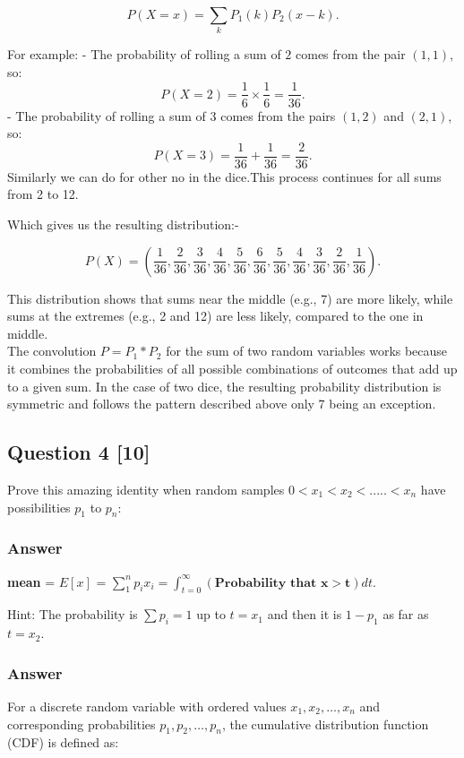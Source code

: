 \documentclass[12pt]{article}
\begin{document}
\[
P(X = x) = \sum_{k} P_1(k) P_2(x - k).
\]

For example:
- The probability of rolling a sum of \( 2 \) comes from the pair \( (1, 1) \), so:
  \[
  P(X = 2) = \frac{1}{6} \times \frac{1}{6} = \frac{1}{36}.
  \]
- The probability of rolling a sum of \( 3 \) comes from the pairs \( (1, 2) \) and \( (2, 1) \), so:
  \[
  P(X = 3) = \frac{1}{36} + \frac{1}{36} = \frac{2}{36}.
  \]
Similarly we can do for other no in the dice.This process continues for all sums from 2 to 12.



Which gives us the resulting distribution:-



\[
P(X) = \left( \frac{1}{36}, \frac{2}{36}, \frac{3}{36}, \frac{4}{36}, \frac{5}{36}, \frac{6}{36}, \frac{5}{36}, \frac{4}{36}, \frac{3}{36}, \frac{2}{36}, \frac{1}{36} \right).
\]

This distribution shows that sums near the middle (e.g., 7) are more likely, while sums at the extremes (e.g., 2 and 12) are less likely, compared to the one in middle.\\
The convolution \( P = P_1 * P_2 \) for the sum of two random variables works because it combines the probabilities of all possible combinations of outcomes that add up to a given sum. In the case of two dice, the resulting probability distribution is symmetric and follows the pattern described above only 7 being an exception.



\subsection*{Question 4 [10]}
Prove this amazing identity when random samples \( 0<x_1 < x_2<.....<x_n \) have possibilities \( p_1 \) to \( p_n \):\\
\subsubsection*{Answer}

\begin{center}
\textbf{mean} = \( E[x] \) = \( \sum_{1}^{n} p_i x_i = \int_{t=0}^{\infty} (\textbf{Probability that x} > \textbf{t})dt \).
\end{center}
Hint: The probability is \( \sum p_i = 1 \) up to \( t = x_1 \) and then it is \( 1 - p_1 \) as far as \( t = x_2 \).
\subsubsection*{Answer}
For a discrete random variable with ordered values \(x_1, x_2, \ldots, x_n\) and corresponding probabilities \(p_1, p_2, \ldots, p_n\), the cumulative distribution function (CDF) is defined as:
\end{document}
